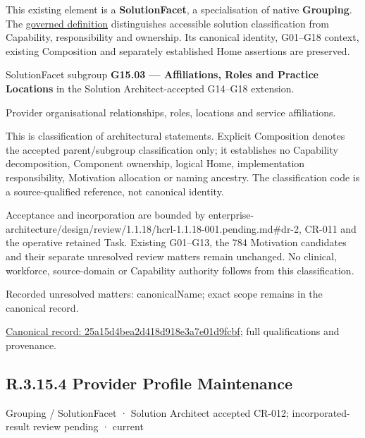 This existing element is a \textbf{SolutionFacet}, a specialisation of native
\textbf{Grouping}. The \href{\detokenize{../../../../../../../governance/continuum-representation.md#solutionfacet-classification--1119-candidate}}{governed definition}
distinguishes accessible solution classification from Capability, responsibility
and ownership. Its canonical identity, G01–G18 context, existing Composition
and separately established Home assertions are preserved.



SolutionFacet subgroup \textbf{G15.03 — Affiliations, Roles and Practice Locations} in the Solution Architect-accepted G14–G18 extension.



Provider organisational relationships, roles, locations and service affiliations.



This is classification of architectural statements. Explicit Composition denotes the accepted parent/subgroup classification only; it establishes no Capability decomposition, Component ownership, logical Home, implementation responsibility, Motivation allocation or naming ancestry. The classification code is a source-qualified reference, not canonical identity.



Acceptance and incorporation are bounded by enterprise-architecture/design/review/1.1.18/hcrl-1.1.18-001.pending.md\#dr-2, CR-011 and the operative retained Task. Existing G01–G13, the 784 Motivation candidates and their separate unresolved review matters remain unchanged. No clinical, workforce, source-domain or Capability authority follows from this classification.


{\small Recorded unresolved matters: canonicalName; exact scope remains in the canonical record.}\par
{\footnotesize \href{../../../../../../../continuum/grouping/25a15d4bea2d418d918e3a7e01d9fcbf.md}{Canonical record: 25a15d4bea2d418d918e3a7e01d9fcbf}; full qualifications and provenance.}\par
\subsection*{R.3.15.4 Provider Profile Maintenance}
\label{navigation:R.3.15.4}

\label{element:a47808600e8f4d7c83756f4ce77b498e}
{\small Grouping / SolutionFacet · Solution Architect accepted CR-012; incorporated-result review pending · current}\par

